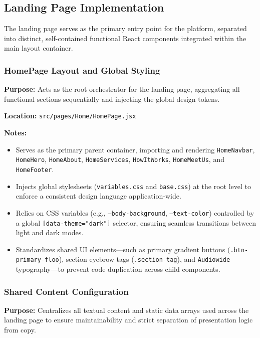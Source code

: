 
\subsection{Landing Page Implementation}
The landing page serves as the primary entry point for the platform, separated into distinct, self-contained functional React components integrated within the main layout container.

\subsubsection{HomePage Layout and Global Styling}

\textbf{Purpose:} Acts as the root orchestrator for the landing page, aggregating all functional sections sequentially and injecting the global design tokens.

\vspace{0.2cm}
\noindent\textbf{Location:} \texttt{src/pages/Home/HomePage.jsx}

\vspace{0.2cm}
\noindent\textbf{Notes:}
\begin{itemize}
    \item Serves as the primary parent container, importing and rendering \texttt{HomeNavbar}, \texttt{HomeHero}, \texttt{HomeAbout}, \texttt{HomeServices}, \texttt{HowItWorks}, \texttt{HomeMeetUs}, and \texttt{HomeFooter}.
    \item Injects global stylesheets (\texttt{variables.css} and \texttt{base.css}) at the root level to enforce a consistent design language application-wide.
    \item Relies on CSS variables (e.g., \texttt{--body-background}, \texttt{--text-color}) controlled by a global \texttt{[data-theme="dark"]} selector, ensuring seamless transitions between light and dark modes.
    \item Standardizes shared UI elements—such as primary gradient buttons (\texttt{.btn-primary-floo}), section eyebrow tags (\texttt{.section-tag}), and \texttt{Audiowide} typography—to prevent code duplication across child components.
\end{itemize}

\subsubsection{Shared Content Configuration}

\textbf{Purpose:} Centralizes all textual content and static data arrays used across the landing page to ensure maintainability and strict separation of presentation logic from copy.

